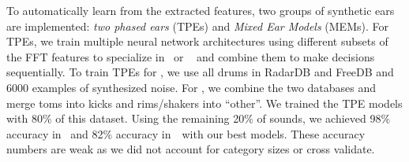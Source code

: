 \documentclass[runningheads,a4paper]{llncs}
\begin{document}
\begin{table}[tbp]
\caption{Overview of model architectures. Further details in Appendix~\ref{appendix:classifier_definitions}}
\end{table}

To automatically learn from the extracted features, two groups of synthetic ears are implemented: \emph{two phased ears} (TPEs) and \emph{Mixed Ear Models} (MEMs).  For TPEs, we train multiple neural network architectures using different subsets of the FFT features to specialize in \decfirst~or \decsecond~ and combine them to make decisions sequentially. To train TPEs for \decfirst, we use all drums in RadarDB and FreeDB and 6000 examples of synthesized noise. For \decsecond, we combine the two databases and merge toms into kicks and rims/shakers into \enquote{other}. We trained the TPE models with 80\% of this dataset. Using the remaining 20\% of sounds, we achieved 98\% accuracy in \decfirst~and 82\% accuracy in~\decsecond~with our best models. These accuracy numbers are weak as we did not account for category sizes or cross validate.
\end{document}
